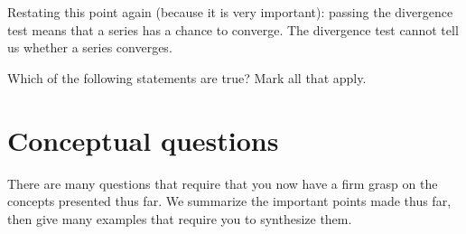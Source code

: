 \documentclass{ximera}
\begin{document}
Restating this point again (because it is very important): passing the divergence test 
means that a series has a chance to converge.  The divergence test cannot tell us 
whether a series converges.

\begin{question}
Which of the following statements are true?  Mark all that apply.
\begin{selectAll}
\end{selectAll}
\end{question}


\section{Conceptual questions}
There are many questions that require that you now have a firm grasp on the concepts presented thus far.  We summarize the important points made thus far, then give many examples that require you to synthesize them.
\end{document}
